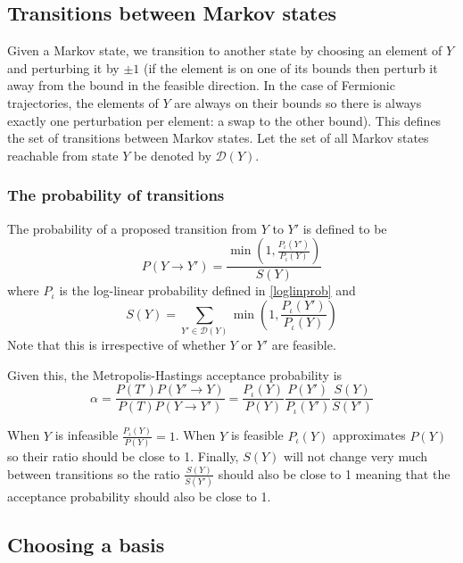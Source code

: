 \documentclass{article}
\begin{document}
\subsection{Transitions between Markov states}

Given a Markov state, we transition to another state by choosing an element of  $Y$ and perturbing it by $\pm 1$ (if the element is on one of its bounds then perturb it away from the bound in the feasible direction. In the case of Fermionic trajectories, the elements of $Y$ are always on their bounds so there is always exactly one perturbation per element: a swap to the other bound). This defines the set of transitions between Markov states. Let the set of all Markov states reachable from state $Y$ be denoted by $\mathcal{D}(Y)$. 

\subsubsection{The probability of transitions}

The probability of a proposed transition from $Y$ to $Y'$ is defined to be
\[
P(Y \to Y') = \frac{\min\left(1, \frac{P_\iota(Y')}{P_\iota(Y)}\right)}{S(Y)} 
\]
where $P_\iota$ is the log-linear probability defined in \eqref{loglinprob} and
\[
S(Y) = \sum_{Y'\in \mathcal{D}(Y)}\min\left(1, \frac{P_\iota(Y')}{P_\iota(Y)}\right)
\]
Note that this is irrespective of whether $Y$ or $Y'$ are feasible.

Given this, the Metropolis-Hastings acceptance probability is
\[
\alpha = \frac{P(T')P(Y' \to Y)}{P(T)P(Y \to Y')} = 
\frac{P_\iota(Y)}{P(Y)} \frac{P(Y')}{P_\iota(Y')}  \frac{S(Y)}{S(Y')}
\]

When $Y$ is infeasible $\frac{P_\iota(Y)}{P(Y)} = 1$. When $Y$ is feasible $P_\iota(Y)$ approximates $P(Y)$ so their ratio should be close to 1. Finally, $S(Y)$ will not change very much between transitions so the ratio $ \frac{S(Y)}{S(Y')}$ should also be close to 1 meaning that the acceptance probability should also be close to 1.

\subsection{Choosing a basis}
\end{document}
